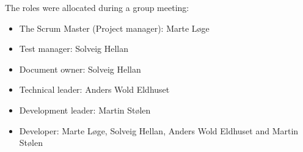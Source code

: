 The roles were allocated during a group meeting:
\begin{itemize}
  \item The Scrum Master (Project manager): Marte Løge
  \item Test manager: Solveig Hellan
  \item Document owner: Solveig Hellan
  \item Technical leader: Anders Wold Eldhuset
  \item Development leader: Martin Stølen
  \item Developer: Marte Løge, Solveig Hellan, Anders Wold Eldhuset and Martin Stølen
\end{itemize}





